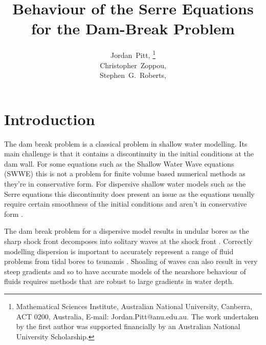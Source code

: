 \documentclass[SingleSpace,12pt,Proceedings]{Serre_ASCE}
\begin{document}
\title{Behaviour of the Serre Equations for the Dam-Break Problem}

\author{
Jordan~Pitt,%
\thanks{Mathematical Sciences Institute, Australian National University, Canberra, ACT 0200, Australia, E-mail: Jordan.Pitt@anu.edu.au. The work undertaken by the first author was supported financially by an Australian National University Scholarship.}
\\
Christopher~Zoppou,\footnotemark[1]%
%
\\
Stephen~G.~Roberts,\footnotemark[1]
}

\maketitle

\begin{abstract}

\end{abstract}


\linenumbers

\section{Introduction} \label{intro} 
The dam break problem is a classical problem in shallow water modelling. Its main challenge is that it contains a discontinuity in the initial conditions at the dam wall. For some equations such as the Shallow Water Wave equations (SWWE) this is not a problem for finite volume based numerical methods \cite{Zoppou-Roberts-2003-11} as they're in conservative form. For dispersive shallow water models such as the Serre equations this discontinuity does present an issue as the equations usually require certain smoothness of the initial conditions and aren't in conservative form \cite{Dutykh-2014-315}. 

The dam break problem for a dispersive model results in undular bores as the sharp shock front decomposes into solitary waves at the shock front \cite{Peregrine-D-1966-321}. Correctly modelling dispersion is important to accurately represent a range of fluid problems from tidal bores to tsunamis \cite{Glimsdal-etal-2013-1507}. Shoaling of waves can also result in very steep gradients and so to have accurate models of the nearshore behaviour of fluids requires methods that are robust to large gradients in water depth. 
\end{document}
